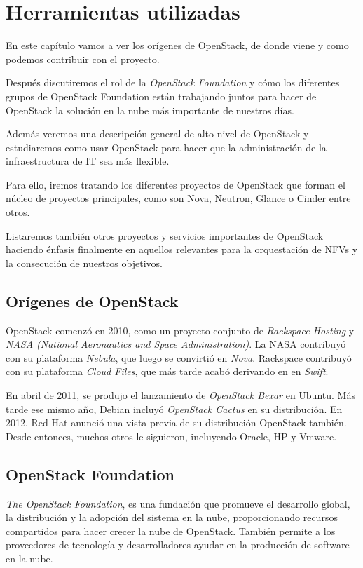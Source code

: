 \chapter{Herramientas utilizadas} \label{chap:herramientasutilizadas}
En este capítulo vamos a ver los orígenes de OpenStack, de donde viene y como podemos contribuir con el proyecto. 

Después discutiremos el rol de la \textit{OpenStack Foundation} y cómo los diferentes grupos de OpenStack Foundation están trabajando juntos para hacer de OpenStack la solución en la nube más importante de nuestros días. 

Además veremos una descripción general de alto nivel de OpenStack y estudiaremos como usar OpenStack para hacer que la administración de la infraestructura de IT sea más flexible. 

Para ello, iremos tratando los diferentes proyectos de OpenStack que forman el núcleo de proyectos principales, como son Nova, Neutron, Glance o Cinder entre otros. 

Listaremos también otros proyectos y servicios importantes de OpenStack haciendo énfasis finalmente en aquellos relevantes para la orquestación de NFVs y la consecución de nuestros objetivos.

\section{Orígenes de OpenStack}
OpenStack comenzó en 2010, como un proyecto conjunto de \textit{Rackspace Hosting} y \textit{NASA (National Aeronautics and Space Administration)}. La NASA contribuyó con su plataforma \textit{Nebula}, que luego se convirtió en \textit{Nova}. Rackspace contribuyó con su plataforma \textit{Cloud Files}, que más tarde acabó derivando en  en \textit{Swift}.

En abril de 2011, se produjo el lanzamiento de \textit{OpenStack Bexar} en Ubuntu. Más tarde ese mismo año, Debian incluyó \textit{OpenStack Cactus} en su distribución. En 2012, Red Hat anunció una vista previa de su distribución OpenStack también. Desde entonces, muchos otros le siguieron, incluyendo Oracle, HP y Vmware.

\section{OpenStack Foundation}
\textit{The OpenStack Foundation}, es una fundación que promueve el desarrollo global, la distribución y la adopción del sistema en la nube, proporcionando recursos compartidos para hacer crecer la nube de OpenStack. También permite a los proveedores de tecnología y desarrolladores ayudar en la producción de software en la nube. \cite{noauthor_foundation_nodate}

